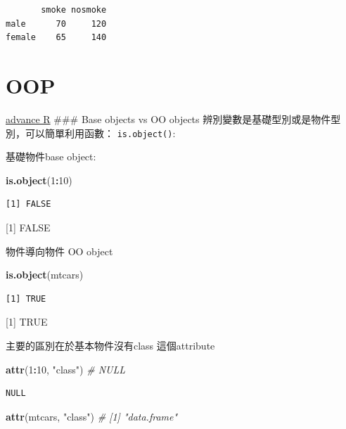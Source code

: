 \documentclass[]{book}
\newenvironment{Shaded}{\begin{snugshade}}{\end{snugshade}}
\newcommand{\CommentTok}[1]{\textcolor[rgb]{0.56,0.35,0.01}{\textit{#1}}}
\newcommand{\DecValTok}[1]{\textcolor[rgb]{0.00,0.00,0.81}{#1}}
\newcommand{\KeywordTok}[1]{\textcolor[rgb]{0.13,0.29,0.53}{\textbf{#1}}}
\newcommand{\NormalTok}[1]{#1}
\newcommand{\OperatorTok}[1]{\textcolor[rgb]{0.81,0.36,0.00}{\textbf{#1}}}
\newcommand{\StringTok}[1]{\textcolor[rgb]{0.31,0.60,0.02}{#1}}
\theoremstyle{definition}
\theoremstyle{definition}
\theoremstyle{definition}
\theoremstyle{remark}
\begin{document}
\begin{verbatim}
       smoke nosmoke
male      70     120
female    65     140
\end{verbatim}

\hypertarget{oop}{%
\section{OOP}\label{oop}}

\href{https://adv-r.hadley.nz/base-types.html}{advance R} \#\#\# Base
objects vs OO objects 辨別變數是基礎型別或是物件型別，可以簡單利用函數：
\texttt{is.object()}:

基礎物件base object:

\begin{Shaded}
\begin{Highlighting}[]
\KeywordTok{is.object}\NormalTok{(}\DecValTok{1}\OperatorTok{:}\DecValTok{10}\NormalTok{)}
\end{Highlighting}
\end{Shaded}

\begin{verbatim}
[1] FALSE
\end{verbatim}

{[}1{]} FALSE

物件導向物件 OO object

\begin{Shaded}
\begin{Highlighting}[]
\KeywordTok{is.object}\NormalTok{(mtcars)}
\end{Highlighting}
\end{Shaded}

\begin{verbatim}
[1] TRUE
\end{verbatim}

{[}1{]} TRUE

主要的區別在於基本物件沒有class 這個attribute

\begin{Shaded}
\begin{Highlighting}[]
\KeywordTok{attr}\NormalTok{(}\DecValTok{1}\OperatorTok{:}\DecValTok{10}\NormalTok{, }\StringTok{"class"}\NormalTok{) }\CommentTok{#  NULL}
\end{Highlighting}
\end{Shaded}

\begin{verbatim}
NULL
\end{verbatim}

\begin{Shaded}
\begin{Highlighting}[]
\KeywordTok{attr}\NormalTok{(mtcars, }\StringTok{"class"}\NormalTok{) }\CommentTok{# [1] "data.frame"}
\end{Highlighting}
\end{Shaded}
\end{document}
